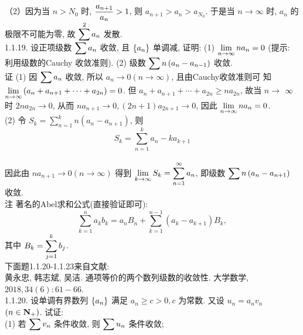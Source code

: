 \documentclass[a4paper,11pt,UTF8]{article}
\begin{document}
（2）因为当 $n>N_0$ 时, $\displaystyle \displaystyle \displaystyle \frac{a_{n+1}}{a_n}>1$, 则 $a_{n+1}>a_n>a_{N_0}$. 于是当 $n \rightarrow \infty$ 时, $a_n$ 的极限不可能为零, 故 $\displaystyle \displaystyle \displaystyle \sum^2 a_n$ 发散.\\
1.1.19. 设正项级数 $\displaystyle \displaystyle \displaystyle \sum a_n$ 收敛, 且 $\displaystyle \displaystyle \displaystyle \left\{a_n\right\}$ 单调减, 证明: (1) $\displaystyle \displaystyle \displaystyle \lim _{n \rightarrow \infty} n a_n=0$ (提示: 利用级数的Cauchy 收敛准则). (2) 级数 $\displaystyle \displaystyle \displaystyle \sum n\left(a_n-a_{n-1}\right)$ 收敛.\\
证 (1) 因 $\displaystyle \displaystyle \displaystyle \sum a_n$ 收敛, 所以 $a_n \rightarrow 0(n \rightarrow \infty)$, 且由Cauchy收敛准则可 知 $\displaystyle \displaystyle \displaystyle \lim _{n \rightarrow \infty}\left(a_n+a_{n+1}+\cdots+a_{2 n}\right)=0$. 但 $a_n+a_{n+1}+\cdots+a_{2 n} \geq n a_{2 n}$, 故当 $n \rightarrow$ $\displaystyle \displaystyle \displaystyle \infty$ 时 $2 n a_{2 n} \rightarrow 0$, 从而 $n a_{n+1} \rightarrow 0,(2 n+1) a_{2 n+1} \rightarrow 0$, 因此 $\displaystyle \displaystyle \displaystyle \lim _{n \rightarrow \infty} n a_n=0$.\\
(2) 令 $S_k=\sum_{n=1}^k n\left(a_n-a_{n+1}\right)$, 则
$$
S_k=\sum_{n=1}^k a_n-k a_{k+1}
$$\\
因此由 $n a_{n+1} \rightarrow 0(n \rightarrow \infty)$ 得到 $\displaystyle \displaystyle \displaystyle \lim _{k \rightarrow \infty} S_k=\sum_{n=1}^{\infty} a_n$, 即级数 $\displaystyle \displaystyle \displaystyle \sum n\left(a_n-a_{n+1}\right)$ 收敛.\\
注 著名的Abel求和公式(直接验证即可):\\
$$
\sum_{k=1}^n a_k b_k=a_n B_n+\sum_{k=1}^{n-1}\left(a_k-a_{k+1}\right) B_k,
$$
其中 $\displaystyle \displaystyle \displaystyle B_k=\sum_{j=1}^k b_j$.\\
下面题1.1.20-1.1.23来自文献:\\
黄永忠, 韩志斌, 吴洁. 通项等价的两个数列级数的收敛性. 大学数学, $2018,34(6): 61-66$.\\
1.1.20. 设单调有界数列 $\displaystyle \displaystyle \displaystyle \left\{a_n\right\}$ 满足 $a_n \geq c>0, c$ 为常数. 又设 $u_n=a_n v_n$ $\displaystyle \displaystyle \displaystyle \left(n \in \mathbf{N}_{+}\right)$. 试证:\\
(1) 若 $\displaystyle \displaystyle \displaystyle \sum v_n$ 条件收敛, 则 $\displaystyle \displaystyle \displaystyle \sum u_n$ 条件收敛;\\
\end{document}
